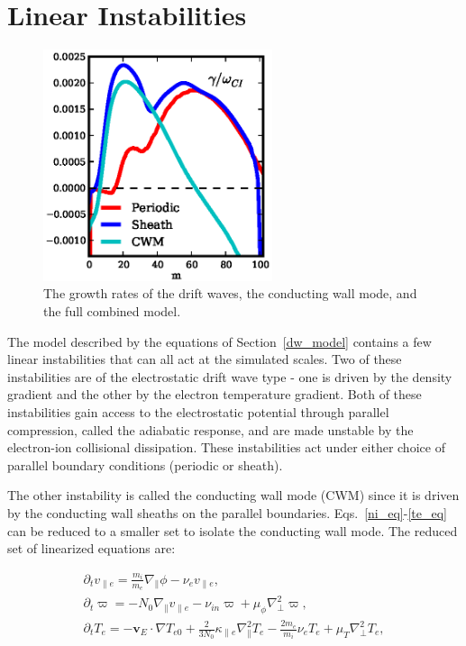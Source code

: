 \documentclass[showpacs,preprintnumbers,amsmath,amssymb,superscriptaddress,aip]{revtex4-1}
\def\beqar{\begin{eqnarray}}
\def\eeqar{\end{eqnarray}}
\newcommand{\pdt}{\partial_t}
\def\grad{\nabla}
\newcommand{\gradpar}{\grad_\parallel}
\newcommand{\gradperp}{\grad_\perp}
\newcommand{\vpe}{v_{\parallel e}}
\newcommand{\nue}{\nu_{e}}
\newcommand{\nuin}{\nu_{in}}
\newcommand{\kpe}{\kappa_{\parallel e}}
\newcommand{\fmie}{\frac{m_i}{m_e}}
\begin{document}
\section{Linear Instabilities}
\label{sec_linear}

\begin{figure}[!htbp]
\includegraphics[width=0.6\textwidth]{gamma_comparisons}
\hfil
\caption{The growth rates of the drift waves, the conducting wall mode, and the full combined model.}
\label{drift_cwm_gamma}
\end{figure}


The model described by the equations of Section~\ref{dw_model} contains a few linear instabilities that can all act at the simulated scales. Two of these instabilities are of the electrostatic
drift wave type - one is driven by the density gradient and the other by the electron temperature gradient. Both of these instabilities gain access to the electrostatic potential through parallel
compression, called the adiabatic response, and are made unstable by the electron-ion collisional dissipation. These instabilities act under either choice of parallel boundary conditions 
(periodic or sheath).

The other instability is called the conducting wall mode (CWM) since it is driven by the conducting wall sheaths on the parallel boundaries. Eqs.~\ref{ni_eq}-\ref{te_eq} can be reduced to a smaller
set to isolate the conducting wall mode. The reduced set of linearized equations are:

\beqar
\label{ve_eq2}
\pdt \vpe = \fmie \gradpar \phi - \nue \vpe, \\
\label{rho_eq2}
\pdt \varpi = - N_0 \gradpar \vpe - \nuin \varpi + \mu_\phi \gradperp^2 \varpi, \\
\label{te_eq2}
\pdt T_e = - {\mathbf v_E} \cdot \grad T_{e0} + \frac{2}{3 N_0} \kpe \gradpar^2 T_e  - \frac{2 m_e}{m_i} \nue T_e  + \mu_T \gradperp^2 T_e,
\eeqar
\end{document}
